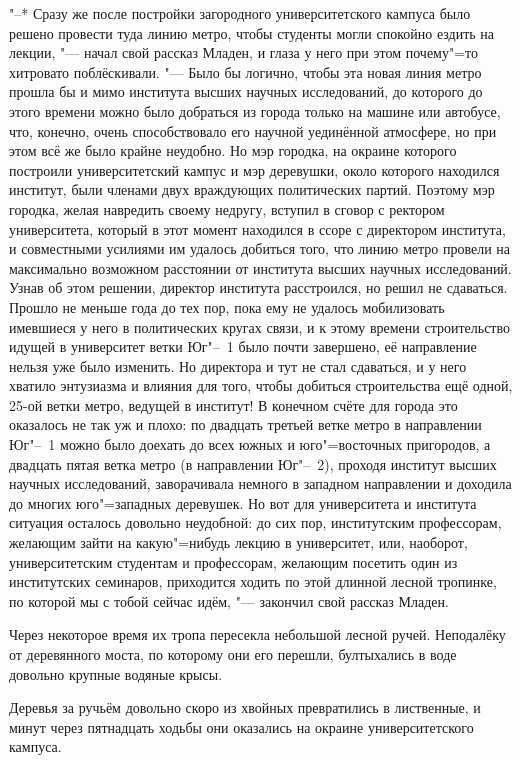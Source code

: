 "--* Сразу же после постройки загородного университетского кампуса было решено
провести туда линию метро, чтобы студенты могли спокойно ездить на лекции,
"--- начал свой рассказ Младен, и глаза у него при этом почему"=то хитровато
поблёскивали.
"--- Было бы логично, чтобы эта новая линия метро прошла бы и мимо института
высших научных исследований, до которого до этого времени можно было добраться
из города только на машине или автобусе, что, конечно, очень способствовало его
научной уединённой атмосфере, но при этом всё же было крайне неудобно.
Но мэр городка, на окраине которого построили университетский кампус и мэр
деревушки, около которого находился институт, были членами двух враждующих
политических партий.
Поэтому мэр городка, желая навредить своему недругу, вступил в сговор с ректором
университета, который в этот момент находился в ссоре с директором института, и
совместными усилиями им удалось добиться того, что линию метро провели на
максимально возможном расстоянии от института высших научных исследований.
Узнав об этом решении, директор института расстроился, но решил не сдаваться.
Прошло не меньше года до тех пор, пока ему не удалось мобилизовать имевшиеся у
него в политических кругах связи, и к этому времени строительство идущей в
университет ветки Юг"--~1 было почти завершено, её направление нельзя уже было
изменить.
Но директора и тут не стал сдаваться, и у него хватило энтузиазма и влияния для
того, чтобы добиться строительства ещё одной, 25-ой ветки метро, ведущей в
институт!
В конечном счёте для города это оказалось не так уж и плохо: по двадцать третьей
ветке метро в направлении Юг"--~1 можно было доехать до всех южных и
юго"=восточных пригородов, а двадцать пятая ветка метро (в направлении Юг"--~2),
проходя институт высших научных исследований, заворачивала немного в западном
направлении и доходила до многих юго"=западных деревушек.
Но вот для университета и института ситуация осталось довольно неудобной: до сих
пор, институтским профессорам, желающим зайти на какую"=нибудь лекцию в
университет, или, наоборот, университетским студентам и профессорам, желающим
посетить один из институтских семинаров, приходится ходить по этой длинной
лесной тропинке, по которой мы с тобой сейчас идём, "--- закончил свой рассказ
Младен.

Через некоторое время их тропа пересекла небольшой лесной ручей.
Неподалёку от деревянного моста, по которому они его перешли, бултыхались в воде
довольно крупные водяные крысы.

Деревья за ручьём довольно скоро из хвойных превратились в лиственные, и минут
через пятнадцать ходьбы они оказались на окраине университетского кампуса.

